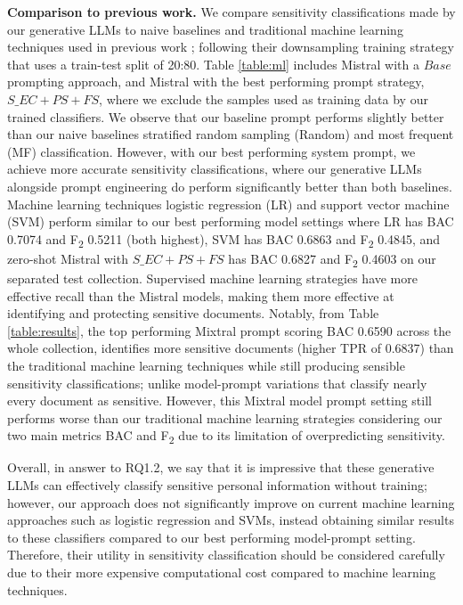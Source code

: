 \textbf{Comparison to previous work.} We compare sensitivity classifications made by our generative LLMs to naive baselines and traditional machine learning techniques used in previous work \cite{mckechnie2024sara}; following their downsampling training strategy that uses a train-test split of 20:80. Table \ref{table:ml} includes Mistral with a $Base$ prompting approach, and Mistral with the best performing prompt strategy, $S\_EC+PS+FS$, where we exclude the samples used as training data by our trained classifiers. We observe that our baseline prompt performs slightly better than our naive baselines stratified random sampling (Random) and most frequent (MF) classification. However, with our best performing system prompt, we achieve more accurate sensitivity classifications, where our generative LLMs alongside prompt engineering do perform significantly better than both baselines. Machine learning techniques logistic regression (LR) and support vector machine (SVM) perform similar to our best performing model settings where LR has BAC 0.7074 and F\textsubscript{2} 0.5211 (both highest), SVM has BAC 0.6863 and F\textsubscript{2} 0.4845, and zero-shot Mistral with $S\_EC+PS+FS$ has BAC 0.6827 and F\textsubscript{2} 0.4603 on our separated test collection. Supervised machine learning strategies have more effective recall than the Mistral models, making them more effective at identifying and protecting sensitive documents. Notably, from Table \ref{table:results}, the top performing Mixtral prompt scoring BAC 0.6590 across the whole collection, identifies more sensitive documents (higher TPR of 0.6837) than the traditional machine learning techniques while still producing sensible sensitivity classifications; unlike model-prompt variations that classify nearly every document as sensitive. However, this Mixtral model prompt setting still performs worse than our traditional machine learning strategies considering our two main metrics BAC and F\textsubscript{2} due to its limitation of overpredicting sensitivity.

Overall, in answer to RQ1.2, we say that it is impressive that these generative LLMs can effectively classify sensitive personal information without training; however, our approach does not significantly improve on current machine learning approaches such as logistic regression and SVMs, instead obtaining similar results to these classifiers compared to our best performing model-prompt setting. Therefore, their utility in sensitivity classification should be considered carefully due to their more expensive computational cost compared to machine learning techniques.

